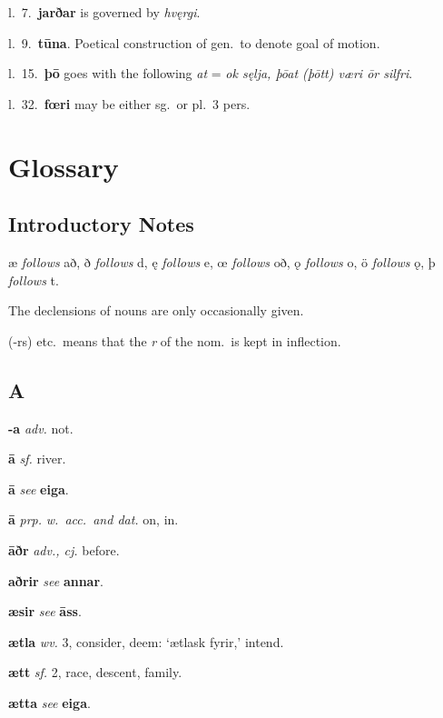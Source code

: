 \documentclass[12pt,letterpaper]{book}
\newcommand\emptypage{\clearpage{\pagestyle{empty}\cleardoublepage}}
\begin{document}
l.\ 7.\ \textbf{jarðar} is governed by \textit{hvęrgi}.

l.\ 9.\ \textbf{tūna}.  Poetical construction of gen.\ to denote goal of
motion.

l.\ 15.\ \textbf{þō} goes with the following \textit{at} = \textit{ok sęlja, þōat (þōtt)
væri ōr silfri}.

l.\ 32.\ \textbf{fœri} may be either sg.\ or pl.\ 3 pers.



\part{Glossary}

\emptypage

\chapter*{Introductory Notes}

æ \textit{follows} að, ð \textit{follows} d, ę \textit{follows} e, œ
\textit{follows} oð, ǫ \textit{follows} o, ö \textit{follows} ǫ, þ
\textit{follows} t.

The declensions of nouns are only occasionally given.

(-rs) etc.\ means that the \textit{r} of the nom.\ is kept in inflection.

\emptypage

\chapter*{A}

\noindent
\textbf{-a} \textit{adv.} not.

\noindent
\textbf{ā} \textit{sf.} river.

\noindent
\textbf{ā} \textit{} \textit{see} \textbf{eiga}.

\noindent
\textbf{ā} \textit{prp.} \textit{w.\ acc.\ and dat.} on, in.

\noindent
\textbf{āðr} \textit{adv., cj.} before.

\noindent
\textbf{aðrir} \textit{} \textit{see} \textbf{annar}.

\noindent
\textbf{æsir} \textit{} \textit{see} \textbf{āss}.

\noindent
\textbf{ætla} \textit{wv.} 3, consider, deem: `ætlask fyrir,' intend.

\noindent
\textbf{ætt} \textit{sf.} 2, race, descent, family.

\noindent
\textbf{ætta} \textit{} \textit{see} \textbf{eiga}.
\end{document}
